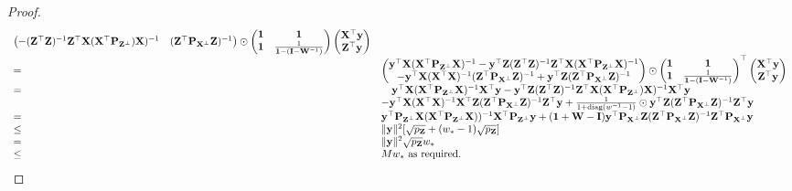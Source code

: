 \documentclass{amsart}[12pt]
\begin{document}
\begin{proof}
\begin{equation*}
\begin{array}{ll}
\begin{pmatrix}
-({\bf Z}^\top {\bf Z})^{-1} {\bf Z}^\top {\bf X} ({\bf X}^\top {\bf P}_{{\bf Z}^\perp}) {\bf X})^{-1} & ({\bf Z}^\top {\bf P}_{{\bf X}^\perp} {\bf Z})^{-1}
\end{pmatrix}
\odot
\begin{pmatrix}
{\bf1} & {\bf 1} \\
{\bf 1} & \frac{1}{{\bf 1} - ({\bf I} - {\bf W}^{-1})}
\end{pmatrix}
\begin{pmatrix}
{\bf X}^\top {\bf y}\\
{\bf Z}^\top {\bf y}
\end{pmatrix} \\
=&
\begin{pmatrix}
{\bf y}^\top {\bf X}({\bf X}^\top {\bf P}_{{\bf Z}^\perp} {\bf X})^{-1} - {\bf y}^\top {\bf Z}({\bf Z}^\top {\bf Z})^{-1} {\bf Z}^\top {\bf X} ({\bf X}^\top {\bf P}_{{\bf Z}^\perp} {\bf X})^{-1}\\
-{\bf y}^\top {\bf X}({\bf X}^\top {\bf X})^{-1} ({\bf Z}^\top {\bf P}_{{\bf X}^\perp} {\bf Z})^{-1} + {\bf y}^\top {\bf Z}({\bf Z}^\top {\bf P}_{{\bf X}^\perp} {\bf Z})^{-1}
\end{pmatrix}
\odot
\begin{pmatrix}
{\bf1} & {\bf 1} \\
{\bf 1} & \frac{1}{{\bf 1} - ({\bf I} - {\bf W}^{-1})}
\end{pmatrix}
^\top
\begin{pmatrix}
{\bf X}^\top {\bf y} \\
{\bf Z}^\top {\bf y}
\end{pmatrix} \\
=&\quad{\bf y}^\top {\bf X} ({\bf X}^\top {\bf P}_{{\bf Z}^\perp} {\bf X})^{-1} {\bf X}^\top {\bf y} - {\bf y}^\top {\bf Z}({\bf Z}^\top {\bf Z})^{-1} {\bf Z}^\top {\bf X} ({\bf X}^\top {\bf P}_{{\bf Z}^\perp}) {\bf X})^{-1} {\bf X}^\top {\bf y} \\
&-{\bf y}^\top {\bf X} ({\bf X}^\top {\bf X})^{-1} {\bf X}^\top {\bf Z} ({\bf Z}^\top {\bf P}_{{\bf X}^\perp} {\bf Z})^{-1} {\bf Z}^\top {\bf y} + \frac{1}{1 + \text{diag}{(w^{-1} - 1)}} \odot {\bf y}^\top {\bf Z} ({\bf Z}^\top {\bf P}_{{\bf X}^\perp} {\bf Z})^{-1} {\bf Z}^\top {\bf y} \\
=& {\bf y}^\top {\bf P}_{{\bf Z}^\perp} {\bf X} ({\bf X}^\top {\bf P}_{{\bf Z}^\perp} {\bf X}))^{-1} {\bf X}^\top {\bf P}_{{\bf Z}^\perp} {\bf y}
+ ({\bf 1} + {\bf W} - {\bf I}) {\bf y}^\top {\bf P}_{{\bf X}^\perp} {\bf Z} ({\bf Z}^\top {\bf P}_{{\bf X}^\perp} {\bf Z})^{-1} {\bf Z}^\top {\bf P}_{{\bf X}^\perp} {\bf y} \\
\leq& \| {\bf y} \|^2 [\sqrt{p_{\bf Z}} + (w_* - 1) \sqrt{p_{\bf Z}}] \\
=& \| {\bf y} \|^2 \sqrt{p_{\bf Z}} w_* \\
\leq& M w_* \text{ as required}.
\end{array}
\end{equation*}
 
\end{proof}
\end{document}
